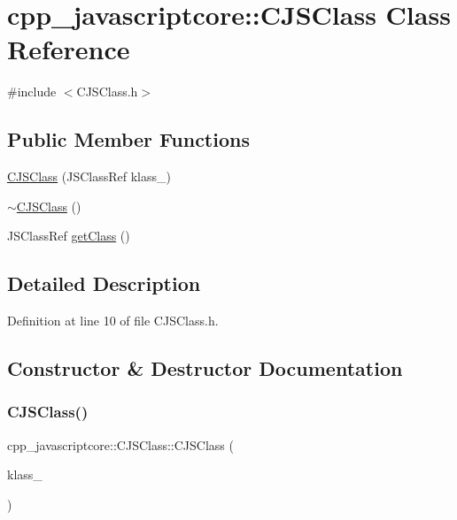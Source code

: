 \hypertarget{classcpp__javascriptcore_1_1_c_j_s_class}{}\section{cpp\+\_\+javascriptcore\+:\+:C\+J\+S\+Class Class Reference}
\label{classcpp__javascriptcore_1_1_c_j_s_class}


{\ttfamily \#include $<$C\+J\+S\+Class.\+h$>$}

\subsection*{Public Member Functions}
\begin{DoxyCompactItemize}
\item 
\mbox{\hyperlink{classcpp__javascriptcore_1_1_c_j_s_class_ae2c13d7518c778746bfbedbaf650a24c}{C\+J\+S\+Class}} (J\+S\+Class\+Ref klass\+\_\+)
\item 
\mbox{\hyperlink{classcpp__javascriptcore_1_1_c_j_s_class_a24e99d07c375b6bbc30abbea7a8a528b}{$\sim$\+C\+J\+S\+Class}} ()
\item 
J\+S\+Class\+Ref \mbox{\hyperlink{classcpp__javascriptcore_1_1_c_j_s_class_acb05238883927560fa7e43001226bc91}{get\+Class}} ()
\end{DoxyCompactItemize}


\subsection{Detailed Description}


Definition at line 10 of file C\+J\+S\+Class.\+h.



\subsection{Constructor \& Destructor Documentation}
\mbox{\label{classcpp__javascriptcore_1_1_c_j_s_class_ae2c13d7518c778746bfbedbaf650a24c}} 
\subsubsection{\texorpdfstring{C\+J\+S\+Class()}{CJSClass()}}
{\footnotesize\ttfamily cpp\+\_\+javascriptcore\+::\+C\+J\+S\+Class\+::\+C\+J\+S\+Class (\begin{DoxyParamCaption}\item[{J\+S\+Class\+Ref}]{klass\+\_\+ }\end{DoxyParamCaption})\hspace{0.3cm}{\ttfamily [inline]}}



